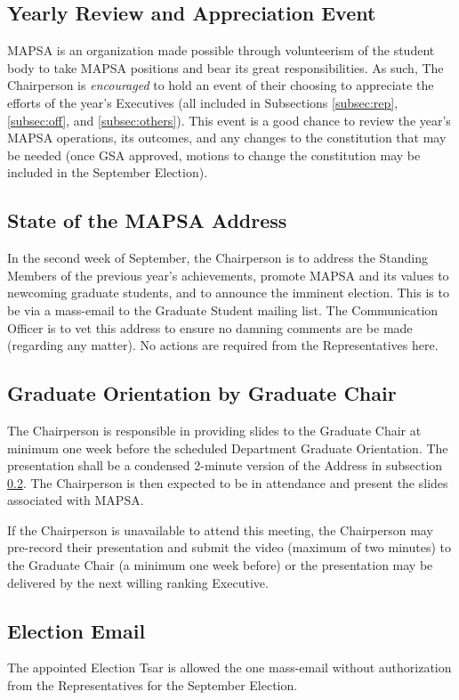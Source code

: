 \documentclass[8pt]{article}
\begin{document}
	\subsection{Yearly Review and Appreciation Event}\label{subsec:app}
	MAPSA is an organization made possible through volunteerism of the student body to take MAPSA positions and bear its great responsibilities. As such, The Chairperson is \textit{encouraged} to hold an event of their choosing to appreciate the efforts of the year's Executives (all included in Subsections \ref{subsec:rep}, \ref{subsec:off}, and \ref{subsec:others}). This event is a good chance to review the year's MAPSA operations, its outcomes, and any changes to the constitution that may be needed (once GSA approved, motions to change the constitution may be included in the September Election).

	\subsection{State of the MAPSA Address}\label{subsec:stateOfTheMAPSA}
	In the second week of September, the Chairperson is to address the Standing Members of the previous year's achievements, promote MAPSA and its values to newcoming graduate students, and to announce the imminent election. This is to be via a mass-email to the Graduate Student mailing list. The Communication Officer is to vet this address to ensure no damning comments are be made (regarding any matter). No actions are required from the Representatives here.
	
	\subsection{Graduate Orientation by Graduate Chair}\label{subsec:orient}
	The Chairperson is responsible in providing slides to the Graduate Chair at minimum one week before the scheduled Department Graduate Orientation. The presentation shall be a condensed 2-minute version of the Address in subsection \ref{subsec:stateOfTheMAPSA}. The Chairperson is then expected to be in attendance and present the slides associated with MAPSA.
	
	If the Chairperson is unavailable to attend this meeting, the Chairperson may pre-record their presentation and submit the video (maximum of two minutes) to the Graduate Chair (a minimum one week before) or the presentation may be delivered by the next willing ranking Executive. 
	
	\subsection{Election Email}\label{subsec:electionEmail}
	The appointed Election Tsar is allowed the one mass-email without authorization from the Representatives for the September Election. 
\end{document}

